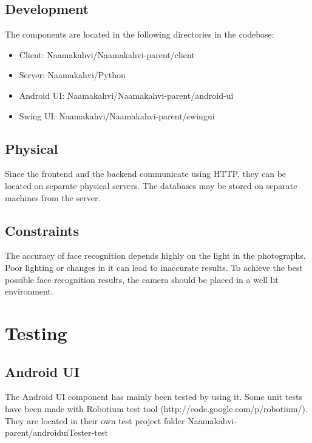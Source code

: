 \documentclass[11pt]{article}
\begin{document}
\subsection{Development}

The components are located in the following directories in the codebase:
\begin{itemize}
\item Client: Naamakahvi/Naamakahvi-parent/client

\item Server: Naamakahvi/Python

\item Android UI: Naamakahvi/Naamakahvi-parent/android-ui

\item Swing UI: Naamakahvi/Naamakahvi-parent/swingui
\end{itemize}


\subsection{Physical}

Since the frontend and the backend communicate using HTTP, they can be
located on separate physical servers. The databases may be stored on separate
machines from the server.%

\subsection{Constraints}
The accuracy of face recognition depends highly on the light in the 
photographs. Poor lighting or changes in it can lead to inaccurate results.
To achieve the best possible face recognition results, the camera should be 
placed in a well lit environment.

\section{Testing}

\subsection{Android UI}
The Android UI component has mainly been tested by using it. Some unit tests have been made
with Robotium test tool (http://code.google.com/p/robotium/). They are located in their own
test project folder Naamakahvi-parent/androiduiTester-test
\end{document}
